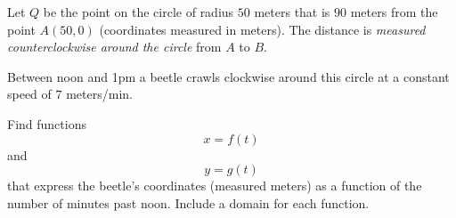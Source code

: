 \documentclass{ximera}
\begin{document}
\begin{question}  \label{Qghggnmnree}
Let $Q$ be the point on the circle of radius $50$ meters that is $90$ meters from the point $A(50,0)$  (coordinates measured in meters). The distance is \emph{measured counterclockwise around the circle} from $A$ to $B$. 

Between noon and 1pm a beetle crawls clockwise around this circle at a constant speed of $7$ meters/min.

\item Find functions 
\[
    x = f(t)
\]
and 
\[
 y = g(t)
\]
that express the beetle's coordinates (measured meters) as a function of the number of minutes past noon. Include a domain for 
each function.
\end{question}
\end{document}
